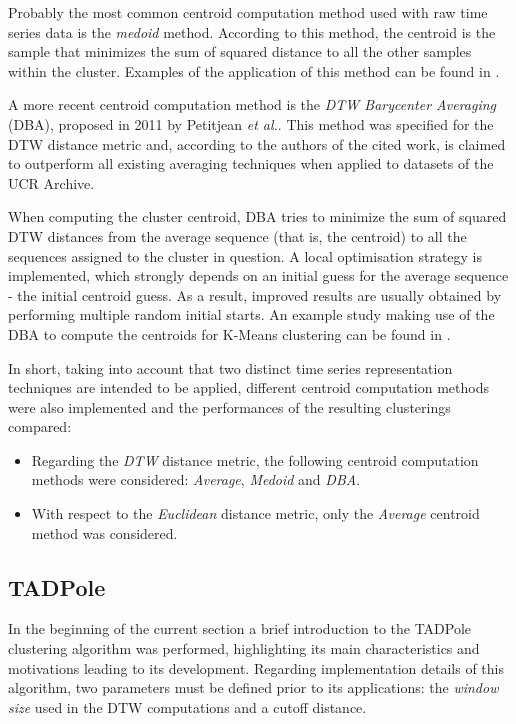 \documentclass[9pt,journal,compsoc]{IEEEtran}
\begin{document}
Probably the most common centroid computation method used with raw time series data is the \emph{medoid} method. According to this method, the centroid is the sample that minimizes the sum of squared distance to all the other samples within the cluster. Examples of the application of this method can be found in \cite{liao2006adaptive, izakian2015fuzzy}.

A more recent centroid computation method is the \emph{DTW Barycenter Averaging} (DBA)\cite{petitjean2011global}, proposed in 2011 by Petitjean \emph{et al.}. This method was specified for the DTW distance metric and, according to the authors of the cited work, is claimed to outperform all existing averaging techniques when applied to datasets of the UCR Archive\cite{keogh2006ucr}.

When computing the cluster centroid, DBA tries to minimize the sum of squared DTW distances from the average sequence (that is, the centroid) to all the sequences assigned to the cluster in question. A local optimisation strategy is implemented, which strongly depends on an initial guess for the average sequence - the initial centroid guess. As a result, improved results are usually obtained by performing multiple random initial starts. An example study making use of the DBA to compute the centroids for K-Means clustering can be found in \cite{petitjean2014dynamic}.

In short, taking into account that two distinct time series representation techniques are intended to be applied, different centroid computation methods were also implemented and the performances of the resulting clusterings compared:

\begin{itemize}
	\item Regarding the \emph{DTW} distance metric, the following centroid computation methods were considered: \emph{Average}, \emph{Medoid} and \emph{DBA}.
	
	\item With respect to the \emph{Euclidean} distance metric, only the \emph{Average} centroid method was considered.
\end{itemize}

\subsection{TADPole}

In the beginning of the current section a brief introduction to the TADPole clustering algorithm was performed, highlighting its main characteristics and motivations leading to its development. Regarding implementation details of this algorithm, two parameters must be defined prior to its applications: the \emph{window size} used in the DTW computations and a cutoff distance.
\end{document}

